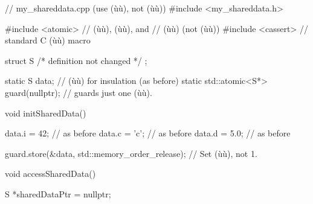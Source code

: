 \begin{emcppslisting}
// my_shareddata.cpp (use (ù{}ù), not (ù{}ù))                                                          
#include <my_shareddata.h>                                                      
                                                                                
#include <atomic>  // (ù{}ù), (ù{}ù), and               
                   // (ù{}ù) (not (ù{}ù))                 
#include <cassert> // standard C (ù{}ù) macro                                   
                                                                                
struct S                                                                        
{                                                                               
    /* definition not changed */                                                
};                                                                              
                                                                                
static S               data;           // (ù{}ù) for insulation (as before)   
static std::atomic<S*> guard(nullptr); // guards just one (ù{}ù).           
                                                                                
void initSharedData()                                                           
{                                                                               
    data.i = 42;   // as before                                                 
    data.c = 'c';  // as before                                                 
    data.d = 5.0;  // as before                                                 
                                                                                
    guard.store(&data, std::memory_order_release);  // Set (ù{}ù), not 1.      
}                                                                               
                                                                                
void accessSharedData()                                                         
{                                                                               
    S *sharedDataPtr = nullptr;                                                 
                                                                                
}
\end{emcppslisting}
